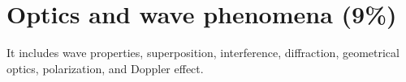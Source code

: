 
\section{Optics and wave phenomena (9\%)}

It includes wave properties, superposition, interference, diffraction, geometrical optics, polarization, and Doppler effect.


